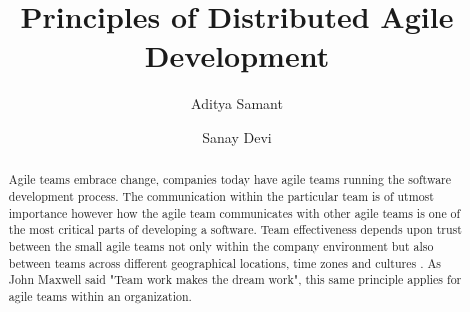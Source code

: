 \documentclass[sigplan,screen]{acmart}
\begin{document}
%
\title{Principles of Distributed Agile Development}

%

\author{Aditya Samant}

\author{Sanay Devi}


%

%
\begin{abstract}
Agile teams embrace change, companies today have agile teams running the software development process. The communication within the particular team is of utmost importance however how the agile team communicates with other agile teams is one of the most critical parts of developing a software. Team effectiveness depends upon trust between the small agile teams not only within the company environment but also between teams across different geographical locations, time zones and cultures \cite{Siva13}. As John Maxwell said "Team work makes the dream work", this same principle applies for agile teams within an organization. 
\end{abstract}


%

%
\end{document}
